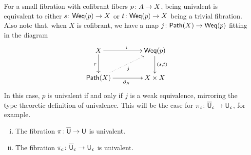 \documentclass[reqno,10pt,a4paper,oneside,draft]{amsart}
\begin{document}
\smallskip

For a small fibration with cofibrant fibers $p \colon A \to X$, being univalent is equivalent to
either $s \colon \mathsf{Weq}(p) \to X$ or $t \colon \mathsf{Weq}(p) \to X$ being a trivial fibration.  Also note that, when $X$
is cofibrant, we have a map $j \colon \mathsf{Path}(X) \to \mathsf{Weq}(p)$ fitting in the diagram
\[
\xymatrix@C=1.5cm{
X \ar[r]^i \ar[d]_r & \Weq(p) \ar[d]^{(s,t)} \\
\Path(X) \ar[r]_{\partial_X}  \ar@{.>}[ur]_{j} &  X \times X }
\]
In this case, $p$ is univalent if and only if $j$ is a weak equivalence, mirroring the type-theoretic
definition of univalence. This will be the case for $\pi_c \colon \overline{\mathsf{U}}_c \to \mathsf{U}_c$, for example.





\begin{theorem}  \label{thm:univalence-of-u-and-uc} \hfill 
\begin{enumerate}[(i)]
\item The fibration $\pi \colon \overline{\mathsf{U}} \to \mathsf{U}$ is univalent.
\item The fibration $\pi_c \colon \overline{\mathsf{U}}_c \to \mathsf{U}_c$ is univalent.
\end{enumerate}
\end{theorem}
\end{document}
